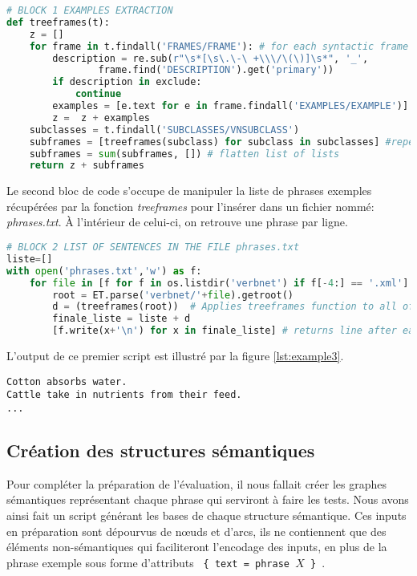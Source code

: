 \begin{lstlisting}[language=Python, caption = Extraction des phrases exemples de VerbNet, label=lst:example1]
# BLOCK 1 EXAMPLES EXTRACTION
def treeframes(t):
    z = []
    for frame in t.findall('FRAMES/FRAME'): # for each syntactic frame
        description = re.sub(r"\s*[\s\.\-\ +\\\/\(\)]\s*", '_',
				frame.find('DESCRIPTION').get('primary'))
        if description in exclude:
            continue    
        examples = [e.text for e in frame.findall('EXAMPLES/EXAMPLE')] # get the examples
        z =  z + examples 
    subclasses = t.findall('SUBCLASSES/VNSUBCLASS')
    subframes = [treeframes(subclass) for subclass in subclasses] #repeat operation for subclasses
    subframes = sum(subframes, []) # flatten list of lists
    return z + subframes
\end{lstlisting}

Le second bloc de code s'occupe de manipuler la liste de phrases exemples récupérées par la fonction \emph{treeframes} pour l'insérer dans un fichier nommé: \emph{phrases.txt}. À l'intérieur de celui-ci, on retrouve une phrase par ligne.

\begin{lstlisting}[language=Python, caption = Mettre les exemples dans un fichier, label=lst:example2]
# BLOCK 2 LIST OF SENTENCES IN THE FILE phrases.txt
liste=[]
with open('phrases.txt','w') as f:
    for file in [f for f in os.listdir('verbnet') if f[-4:] == '.xml']:
        root = ET.parse('verbnet/'+file).getroot()       
        d = (treeframes(root))  # Applies treeframes function to all of VerbNet files
        finale_liste = liste + d  
        [f.write(x+'\n') for x in finale_liste] # returns line after each example
\end{lstlisting}

L'output de ce premier script est illustré par la figure \ref{lst:example3}.

\begin{lstlisting}[language=mate, caption = Contenu du fichier phrases.txt, label=lst:example3]
Cotton absorbs water.
Cattle take in nutrients from their feed.
...
\end{lstlisting}

\subsection{Création des structures sémantiques}\label{sec:pythonstruc}

Pour compléter la préparation de l'évaluation, il nous fallait créer les graphes sémantiques représentant chaque phrase qui serviront à faire les tests. Nous avons ainsi fait un script générant les bases de chaque structure sémantique. Ces inputs en préparation sont dépourvus de n\oe{}uds et d'arcs, ils ne contiennent que des éléments non-sémantiques qui faciliteront l'encodage des inputs, en plus de la phrase exemple sous forme d'attributs \texttt{ \{ text = phrase $X$ \} }.

